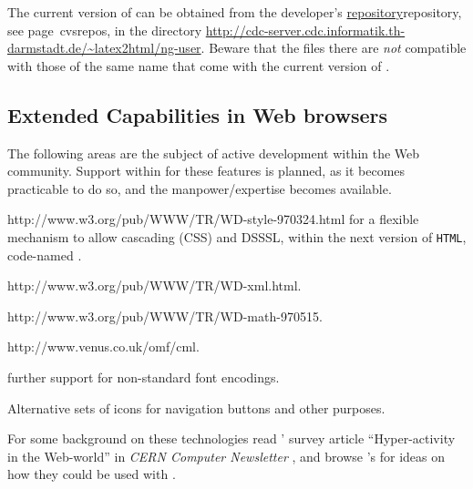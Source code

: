 \medskip\noindent
The current version of \latextohtmlNG{} can be obtained from
the developer's \hyperref[page]{repository}{repository, see page~}{}{cvsrepos},
in the directory
\url{http://cdc-server.cdc.informatik.th-darmstadt.de/~latex2html/ng-user}.
Beware that the files there are \emph{not} compatible with those of the
same name that come with the current version of \latextohtml.



\subsection*{Extended Capabilities in Web browsers}
The following areas are the subject of active development
within the Web community. 
Support within \latextohtml{} for these features is planned,
as it becomes practicable to do so, and the manpower/expertise
becomes available.
\begin{description}
%
%
%
\item [style-sheets: ] %
{http://www.w3.org/pub/WWW/TR/WD-style-970324.html}
for a flexible mechanism to allow cascading (CSS) and DSSSL, 
within the next version of \texttt{HTML}, code-named
.
%
%
%
\item [XML: ] %
{http://www.w3.org/pub/WWW/TR/WD-xml.html}.

%
%
\item [MathML: ] %
{http://www.w3.org/pub/WWW/TR/WD-math-970515}.

%
%
\item [CML: ] %
{http://www.venus.co.uk/omf/cml}.

%
\item [Fonts: ] further support for non-standard font encodings.

%
\item [Icons: ] Alternative sets of icons for navigation buttons 
and other purposes.
\end{description}
For some background on these technologies read
\Goossens' survey article ``Hyper-activity in the Web-world''
in \textsl{CERN Computer Newsletter} 
,
and browse \AxelRamge's 
for ideas on how they could be used with \latextohtml.



\endinput












